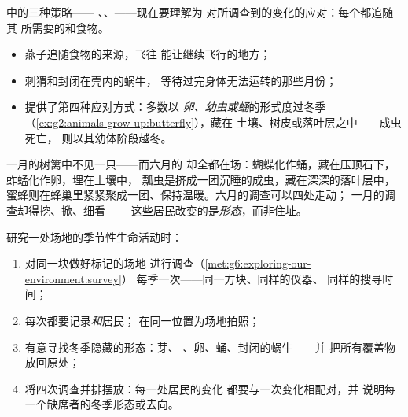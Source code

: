\begin{proposition}\label{prop:g6:life-through-seasons:animals}
中的三种策略——
、、——现在要理解为
对所调查到的变化的应对：每个都追随其
所需要的和食物。
\begin{itemize}
  \item 燕子追随食物的来源，飞往
        能让继续飞行的地方；
  \item 刺猬和封闭在壳内的蜗牛，
        等待过完身体无法运转的那些月份；
  \item {}提供了第四种应对方式：多数以
        \emph{卵、幼虫或蛹}的形式度过冬季
        （\cref{ex:g2:animals-grow-up:butterfly}），藏在
        土壤、树皮或落叶层之中——成虫死亡，
        则以其幼体阶段越冬。
\end{itemize}
\end{proposition}
\admitted

\begin{example}[六月的昆虫在一月时身在何处]\label{ex:g6:life-through-seasons:insects}
一月的树篱中不见一只——而六月的
却全都在场：蝴蝶化作蛹，藏在压顶石下，
蚱蜢化作卵，埋在土壤中，
瓢虫是挤成一团沉睡的成虫，藏在深深的落叶层中，
蜜蜂则在蜂巢里紧紧聚成一团、保持温暖。六月的调查可以四处走动；
一月的调查却得挖、掀、细看——
这些居民改变的是\emph{形态}，而非住址。
\end{example}

\begin{method}[全年调查]\label{met:g6:life-through-seasons:yearsurvey}
研究一处场地的季节性生命活动时：
\begin{enumerate}
  \item 对同一块做好标记的场地
        进行调查（\cref{met:g6:exploring-our-environment:survey}）
        每季一次——同一方块、同样的仪器、
        同样的搜寻时间；
  \item 每次都要记录\emph{和}居民；
        在同一位置为场地拍照；
  \item 有意寻找冬季隐藏的形态：芽、
        、卵、蛹、封闭的蜗牛——并
        把所有覆盖物放回原处；
  \item 将四次调查并排摆放：每一处居民的变化
        都要与一次变化相配对，并
        说明每一个缺席者的冬季形态或去向。
\end{enumerate}
\end{method}


